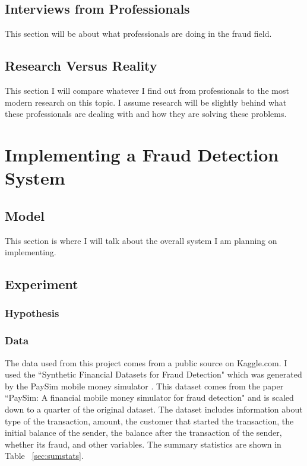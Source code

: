 \documentclass[midd]{thesis}
\begin{document}
\section{ Interviews from Professionals}

This section will be about what professionals are doing in the fraud field.

\section{ Research Versus Reality}

This section I will compare whatever I find out from professionals to the most modern research on this topic. I assume research will be slightly behind what these professionals are dealing with and how they are solving these problems.


\pagebreak
\chapter{Implementing a Fraud Detection System}
\label{sec:impl}


\section{Model}

This section is where I will talk about the overall system I am planning on implementing.

\section{Experiment}

\subsection{Hypothesis}

\subsection{Data}

The data used from this project comes from a public source on Kaggle.com. I used the ``Synthetic Financial Datasets for Fraud Detection" which was generated by the PaySim mobile money simulator \cite{paysim}. This dataset comes from the paper ``PaySim: A financial mobile money simulator for fraud detection" and is scaled down to a quarter of the original dataset. The dataset includes information about type of the transaction, amount, the customer that started the transaction, the initial balance of the sender, the balance after the transaction of the sender, whether its fraud, and other variables. The summary statistics are shown in Table ~\ref{sec:sumstats}. 
\end{document}
